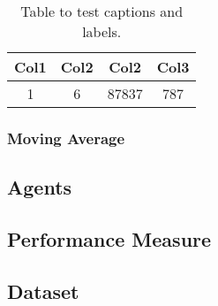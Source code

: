 \begin{center}
    \begin{table}
        \begin{tabular}{|c c c c|} 
            \hline
            Col1 & Col2 & Col2 & Col3 \\
            \hline\hline
            1 & 6 & 87837 & 787 \\ 
            \hline
        \end{tabular}
        \caption{Table to test captions and labels.}
        \label{tbl: hyper space}
    \end{table}
\end{center}

\subsubsection{Moving Average}

\subsection{Agents}

\subsection{Performance Measure}

\subsection{Dataset}
